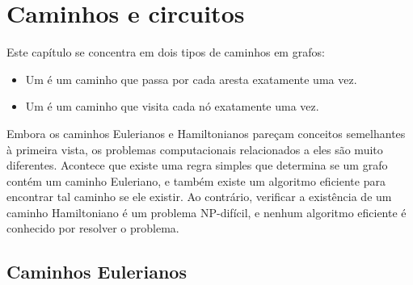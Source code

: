 \chapter{Caminhos e circuitos}

Este capítulo se concentra em dois tipos de caminhos em grafos:
\begin{itemize}
\item Um  é um caminho que
passa por cada aresta exatamente uma vez.
\item Um  é um caminho
que visita cada nó exatamente uma vez.
\end{itemize}

Embora os caminhos Eulerianos e Hamiltonianos pareçam
conceitos semelhantes à primeira vista,
os problemas computacionais relacionados a eles
são muito diferentes.
Acontece que existe uma regra simples que
determina se um grafo contém um caminho Euleriano,
e também existe um algoritmo eficiente para
encontrar tal caminho se ele existir.
Ao contrário, verificar a existência de um caminho Hamiltoniano é um problema NP-difícil,
e nenhum algoritmo eficiente é conhecido por resolver o problema.

\section{Caminhos Eulerianos}


